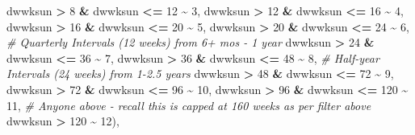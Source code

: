 \documentclass[
]{article}
\newenvironment{Shaded}{\begin{snugshade}}{\end{snugshade}}
\newcommand{\CommentTok}[1]{\textcolor[rgb]{0.56,0.35,0.01}{\textit{#1}}}
\newcommand{\DecValTok}[1]{\textcolor[rgb]{0.00,0.00,0.81}{#1}}
\newcommand{\NormalTok}[1]{#1}
\newcommand{\SpecialCharTok}[1]{\textcolor[rgb]{0.81,0.36,0.00}{\textbf{#1}}}
\begin{document}
\begin{Shaded}
\begin{Highlighting}[]
\NormalTok{                                 dwwksun }\SpecialCharTok{\textgreater{}} \DecValTok{8} \SpecialCharTok{\&}\NormalTok{ dwwksun }\SpecialCharTok{\textless{}=} \DecValTok{12} \SpecialCharTok{\textasciitilde{}} \DecValTok{3}\NormalTok{,}
\NormalTok{                                 dwwksun }\SpecialCharTok{\textgreater{}} \DecValTok{12} \SpecialCharTok{\&}\NormalTok{ dwwksun }\SpecialCharTok{\textless{}=} \DecValTok{16} \SpecialCharTok{\textasciitilde{}} \DecValTok{4}\NormalTok{, }
\NormalTok{                                 dwwksun }\SpecialCharTok{\textgreater{}} \DecValTok{16} \SpecialCharTok{\&}\NormalTok{ dwwksun }\SpecialCharTok{\textless{}=} \DecValTok{20} \SpecialCharTok{\textasciitilde{}} \DecValTok{5}\NormalTok{,}
\NormalTok{                                 dwwksun }\SpecialCharTok{\textgreater{}} \DecValTok{20} \SpecialCharTok{\&}\NormalTok{ dwwksun }\SpecialCharTok{\textless{}=} \DecValTok{24} \SpecialCharTok{\textasciitilde{}} \DecValTok{6}\NormalTok{,}
                                 \CommentTok{\# Quarterly Intervals (12 weeks) from 6+ mos {-} 1 year}
\NormalTok{                                 dwwksun }\SpecialCharTok{\textgreater{}} \DecValTok{24} \SpecialCharTok{\&}\NormalTok{ dwwksun }\SpecialCharTok{\textless{}=} \DecValTok{36} \SpecialCharTok{\textasciitilde{}} \DecValTok{7}\NormalTok{,}
\NormalTok{                                 dwwksun }\SpecialCharTok{\textgreater{}} \DecValTok{36} \SpecialCharTok{\&}\NormalTok{ dwwksun }\SpecialCharTok{\textless{}=} \DecValTok{48} \SpecialCharTok{\textasciitilde{}} \DecValTok{8}\NormalTok{, }
                                 \CommentTok{\# Half{-}year Intervals (24 weeks) from 1{-}2.5 years}
\NormalTok{                                 dwwksun }\SpecialCharTok{\textgreater{}} \DecValTok{48} \SpecialCharTok{\&}\NormalTok{ dwwksun }\SpecialCharTok{\textless{}=} \DecValTok{72} \SpecialCharTok{\textasciitilde{}} \DecValTok{9}\NormalTok{, }
\NormalTok{                                 dwwksun }\SpecialCharTok{\textgreater{}} \DecValTok{72} \SpecialCharTok{\&}\NormalTok{ dwwksun }\SpecialCharTok{\textless{}=} \DecValTok{96} \SpecialCharTok{\textasciitilde{}} \DecValTok{10}\NormalTok{, }
\NormalTok{                                 dwwksun }\SpecialCharTok{\textgreater{}} \DecValTok{96} \SpecialCharTok{\&}\NormalTok{ dwwksun }\SpecialCharTok{\textless{}=} \DecValTok{120} \SpecialCharTok{\textasciitilde{}} \DecValTok{11}\NormalTok{, }
                                 \CommentTok{\# Anyone above {-} recall this is capped at 160 weeks as per filter above}
\NormalTok{                                 dwwksun }\SpecialCharTok{\textgreater{}} \DecValTok{120} \SpecialCharTok{\textasciitilde{}} \DecValTok{12}\NormalTok{),}

\end{Highlighting}
\end{Shaded}
\end{document}
